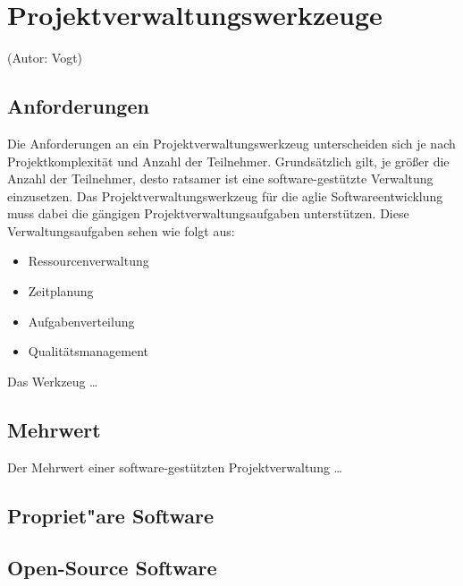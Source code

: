 \section{Projektverwaltungswerkzeuge}
(Autor: Vogt)\\

\subsection{Anforderungen}
Die Anforderungen an ein Projektverwaltungswerkzeug unterscheiden sich je nach Projektkomplexität und Anzahl der Teilnehmer. Grundsätzlich gilt, je größer die Anzahl der Teilnehmer, desto ratsamer ist eine software-gestützte Verwaltung einzusetzen.
Das Projektverwaltungswerkzeug für die aglie Softwareentwicklung muss dabei die gängigen Projektverwaltungsaufgaben unterstützen. Diese Verwaltungsaufgaben sehen wie folgt aus:

\begin{itemize}
	\item Ressourcenverwaltung
	\item Zeitplanung
	\item Aufgabenverteilung
	\item Qualitätsmanagement
\end{itemize}

Das Werkzeug \dots

\subsection{Mehrwert}
Der Mehrwert einer software-gestützten Projektverwaltung \dots 

\subsection{Propriet"are Software}

\subsection{Open-Source Software}

